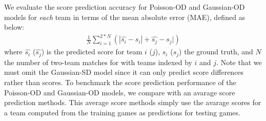 We evaluate the score prediction accuracy for Poisson-OD and
Gaussian-OD models for \emph{each} team in terms of the mean absolute
error (MAE), defined as below:
\begin{align}
    \frac{1}{N} \sum_{i=1}^{2*N} \left(| \hat{s_i} - s_i | + \hat{s_j} - s_j |\right)
\end{align}
where $\hat{s_i}$ ($\hat{s_j}$) is the predicted score for team $i$ ($j$), $s_i$ ($s_j$) the ground truth, and $N$ the number of two-team matches for with teams indexed by $i$ and $j$.
Note that we must omit the Gaussian-SD model since it can only predict score differences rather than scores. To benchmark the score prediction performance of the Poisson-OD and Gaussian-OD models, we compare with an avarage score prediction methods. This average score methods simply use the avarage scores for a team computed from the training games as predictions for testing games.

